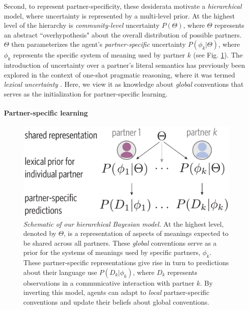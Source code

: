 Second, to represent partner-specificity, these desiderata motivate a \emph{hierarchical} model, where uncertainty is represented by a multi-level prior. 
At the highest level of the hierarchy is \emph{community-level} uncertainty $P(\Theta)$, where $\Theta$ represents an abstract ``overhypothesis" about the overall distribution of possible partners. 
$\Theta$ then parameterizes the agent's \emph{partner-specific} uncertainty $P(\phi_{k} | \Theta)$, where $\phi_k$ represents the specific system of meaning used by partner $k$ (see Fig. \ref{fig:model_schematic}). 
The introduction of uncertainty over a partner's literal semantics has previously been explored in the context of one-shot pragmatic reasoning, where it was termed \emph{lexical uncertainty} \cite{bergen_pragmatic_2016}. 
Here, we view it as knowledge about \emph{global} conventions that serves as the initialization for partner-specific learning.

\paragraph{Partner-specific learning}

\begin{figure}[t!]
\includegraphics[scale=0.4]{./figures/task1_model.pdf}
\vspace{.5em}
\caption{\emph{Schematic of our hierarchical Bayesian model.} At the highest level, denoted by $\Theta$, is a representation of aspects of meanings expected to be shared across all partners. These \emph{global} conventions serve as a prior for the systems of meanings used by specific partners, $\phi_k$. These partner-specific representations give rise in turn to predictions about their language use $P(D_k|\phi_k)$, where $D_k$ represents observations in a communicative interaction with partner $k$. By inverting this model, agents can adapt to \emph{local} partner-specific conventions and update their beliefs about global conventions.}
\label{fig:model_schematic}
\end{figure}

